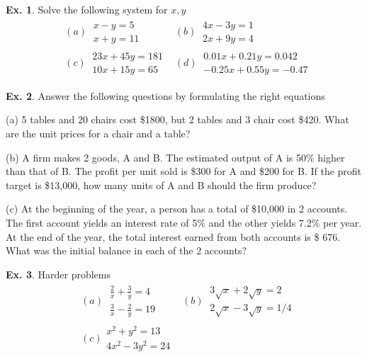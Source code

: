 \documentclass[10pt,a4paper]{book}
\theoremstyle{definition}\newtheorem{definition}{Definition}
\theoremstyle{definition}\newtheorem{fact}{Fact}
\theoremstyle{definition}\newtheorem{ex}{Ex.}
\theoremstyle{definition}\newtheorem{project}{Project}
\theoremstyle{definition}\newtheorem{problem}{Problem}
\theoremstyle{definition}\newtheorem{example}{Example}
\numberwithin{theorem}{chapter}
\numberwithin{corollary}{chapter}
\numberwithin{assumption}{chapter}
\numberwithin{definition}{chapter}
\numberwithin{prop}{chapter}
\numberwithin{notation}{chapter}
\numberwithin{problem}{chapter}
\numberwithin{example}{chapter}
\numberwithin{fact}{chapter}
\numberwithin{ex}{chapter}
\begin{document}
	\begin{ex}
		Solve the following system for $x,y$
		\begin{align*}
			& (a) \ \begin{matrix} 
				x - y =5 \\
				x + y =11
			\end{matrix}
			& (b) \ \begin{matrix} 
				4x - 3y = 1 \\
				2x + 9y = 4
			\end{matrix} \\
			& (c) \ \begin{matrix} 
				23x + 45y = 181 \\
				10x + 15y = 65
			\end{matrix}
			& (d) \ \begin{matrix} 
				0.01x + 0.21y = 0.042 \\
				-0.25 x + 0.55 y = -0.47
			\end{matrix}
		\end{align*}
	\end{ex}
	
	\begin{ex}
		Answer the following questions by formulating the right equations
		
		(a) 5 tables and 20 chairs cost \$1800, but 2 tables and 3 chair cost \$420. What are the unit prices for a chair and a table?
		
		(b) A firm makes 2 goods, A and B. The estimated output of A is 50\% higher than that of B. The profit per unit sold is \$300 for A and \$200 for B. If the profit target is \$13,000, how many units of A and B should the firm produce?
		
		(c) At the beginning of the year, a person has a total of \$10,000 in 2 accounts. The first account yields an interest rate of 5\% and the other yields 7.2\% per year. At the end of the year, the total interest earned from both accounts is \$ 676. What was the initial balance in each of the 2 accounts?
	\end{ex}
	
	\begin{ex}
		Harder problems
		\begin{align*}
			& (a) \ \begin{matrix} 
				\frac{2}{x} + \frac{3}{y} = 4 \\
				\frac{3}{x} - \frac{2}{y} = 19 
			\end{matrix} \
			& (b) \ \begin{matrix} 
				3\sqrt{x} + 2\sqrt{y} = 2 \\
				2\sqrt{x} - 3\sqrt{y} = 1/4
			\end{matrix} \\
			& (c) \begin{matrix}   
				x^2 + y^2 = 13 \\
				4x^2 - 3y^2 = 24
			\end{matrix}
		\end{align*}
	\end{ex}
	
\end{document}

